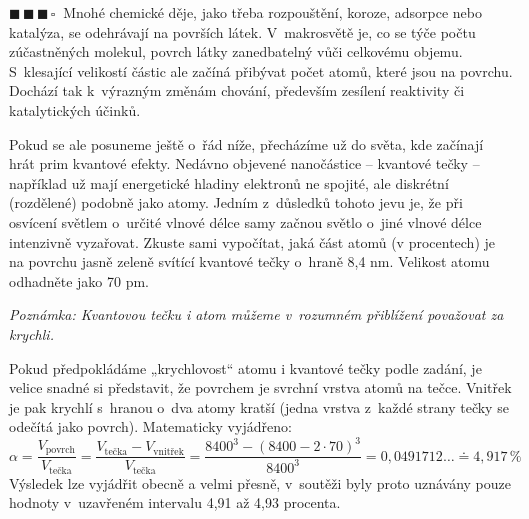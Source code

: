 \documentclass{book}
\newcommand{\tri}{$\blacksquare \, \blacksquare \, \blacksquare \, \square \; \; $}
\renewenvironment{quotation}{\par}{\par} %
\begin{document}
\hrulefill %
\begin{quotation}
\tri Mnohé chemické děje, jako třeba rozpouštění, koroze, adsorpce nebo
katalýza, se odehrávají na površích látek. V~makrosvětě je, co se
týče počtu zúčastněných molekul, povrch látky zanedbatelný vůči celkovému
objemu. S~klesající velikostí částic ale začíná přibývat počet atomů,
které jsou na povrchu. Dochází tak k~výrazným změnám chování, především
zesílení reaktivity či katalytických účinků.

Pokud se ale posuneme
ještě o~řád níže, přecházíme už do světa, kde začínají hrát prim kvantové
efekty. Nedávno objevené nanočástice -- kvantové tečky -- například
už mají energetické hladiny elektronů ne spojité, ale diskrétní (rozdělené)
podobně jako atomy. Jedním z~důsledků tohoto jevu je, že při osvícení světlem o~určité
vlnové délce samy začnou světlo o~jiné vlnové délce intenzivně vyzařovat. 
\newpage %
Zkuste sami vypočítat, jaká část atomů (v procentech) je na povrchu jasně zeleně svítící
kvantové tečky o~hraně 8,4 nm. Velikost atomu odhadněte jako 70 pm. 

\textit{Poznámka: Kvantovou tečku i atom můžeme v~rozumném přiblížení považovat
za krychli.}
\end{quotation} \dotfill \par 
Pokud předpokládáme „krychlovost“ atomu i kvantové tečky podle zadání,
je velice snadné si představit, že povrchem je svrchní vrstva
atomů na tečce. Vnitřek je pak krychlí s~hranou o~dva atomy kratší
(jedna vrstva z~každé strany tečky se odečítá jako povrch). Matematicky
vyjádřeno: 
\[
\alpha=\frac{V_{\mathrm{povrch}}}{V_{\mathrm{tečka}}}=\frac{V_{\mathrm{tečka}}-V_{\mathrm{vnitřek}}}{V_{\mathrm{tečka}}}=\frac{8400^{3}-(8400-2\cdot70)^{3}}{8400^{3}}=0,0491712\ldots\doteq4,917\,\%
\]
 Výsledek lze vyjádřit obecně a velmi přesně, v~soutěži byly proto uznávány
pouze hodnoty v~uzavřeném intervalu 4,91 až 4,93 procenta. 
\end{document}
